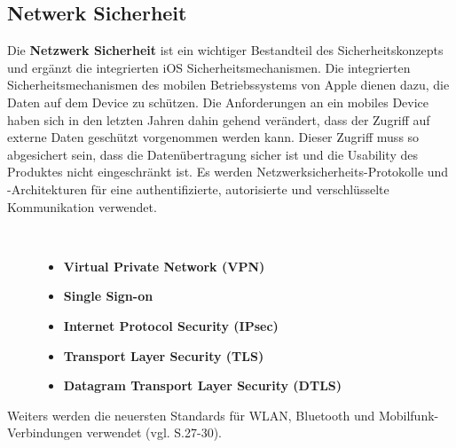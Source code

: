 \subsection{Netwerk Sicherheit}
\label{sec:NetworkSec}
Die \textbf{ Netzwerk Sicherheit} ist ein wichtiger Bestandteil des Sicherheitskonzepts und ergänzt die integrierten iOS Sicherheitsmechanismen. Die integrierten Sicherheitsmechanismen des mobilen Betriebssystems von Apple dienen dazu, die Daten auf dem Device zu schützen. Die Anforderungen an ein mobiles Device haben sich in den letzten Jahren dahin gehend verändert, dass der Zugriff auf externe Daten geschützt vorgenommen werden kann. Dieser Zugriff muss so abgesichert sein, dass die Datenübertragung sicher ist und die Usability des Produktes nicht eingeschränkt ist. Es werden Netzwerksicherheits-Protokolle und -Architekturen für eine authentifizierte, autorisierte und verschlüsselte Kommunikation verwendet.
\begin{description}
\item[\parbox{\textwidth} {Ein iOS Device verfügt über folgende Netzwerksicherheits-Protokolle und -Architekturen
}]~\par
	\begin{itemize}
		\item \textbf{Virtual Private Network (VPN)}
 		\item \textbf{Single Sign-on}
 		\item \textbf{Internet Protocol Security (IPsec)}
 		\item \textbf{Transport Layer Security (TLS)} %
		\item \textbf{Datagram Transport Layer Security (DTLS)}
        \end{itemize}
\end{description}
Weiters werden die neuersten Standards für WLAN, Bluetooth und Mobilfunk-Verbindungen verwendet (vgl. \cite{Apple[4]} S.27-30).
